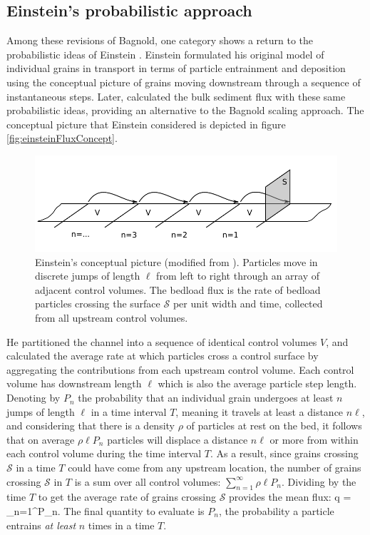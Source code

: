 \subsection{Einstein's probabilistic approach}

Among these revisions of Bagnold, one category shows a return to the probabilistic ideas of Einstein \citep{Parker2003,Ancey2006}.
Einstein formulated his original model of individual grains in transport \citep{Einstein1937} in terms of particle entrainment and deposition using the conceptual picture of grains moving downstream through a sequence of instantaneous steps.
Later, \citet{Einstein1942,Einstein1950} calculated the bulk sediment flux with these same probabilistic ideas, providing an alternative to the Bagnold scaling approach.
The conceptual picture that Einstein considered is depicted in figure \ref{fig:einsteinFluxConcept}.
 \begin{figure}[!htbp]
	\includegraphics[width=\linewidth,keepaspectratio]{./figures/ch1/yalinDrawing.pdf}
	\caption{Einstein’s conceptual picture (modified from \citet{Yalin1972}). Particles move in discrete jumps of length $\ell$ from
left to right through an array of adjacent control volumes. The bedload flux is the rate of bedload particles crossing
the surface $\mathcal{S}$ per unit width and time, collected from all upstream control volumes.}
	\label{fig:lislefig}
\end{figure}

He partitioned the channel into a sequence of identical control volumes $V$, and calculated the average rate at which particles cross a control surface by aggregating the contributions from each upstream control volume.
Each control volume has downstream length $\ell$ which is also the average particle step length.
Denoting by $P_n$ the probability that an individual grain undergoes at least $n$ jumps of length $\ell$ in a time interval $T$, meaning it travels at least a distance $n \ell$, and considering that there is a density $\rho$ of particles at rest on the bed, it follows that on average $\rho \ell P_n$ particles will displace a distance $n \ell$ or more from within each control volume during the time interval $T$. 
As a result, since grains crossing $\mathcal{S}$ in a time $T$ could have come from any upstream location, the number of grains crossing $\mathcal{S}$ in $T$ is a sum over all control volumes: $\sum_{n=1}^\infty \rho \ell P_n$.
Dividing by the time $T$ to get the average rate of grains crossing $\mathcal{S}$ provides the mean flux:
\be q =  \sum_{n=1}^\infty P_n. \label{eq:einflux} \ee
The final quantity to evaluate is $P_n$, the probability a particle entrains \textit{at least} $n$ times in a time $T$.

